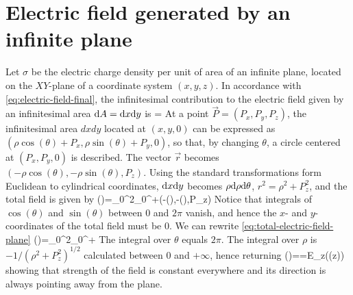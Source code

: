 \section{Electric field generated by an infinite plane}
Let $\sigma$ be the electric charge density per unit of area of an infinite plane, located on the $XY$-plane of a coordinate system $(x,y,z)$. In accordance with \ref{eq:electric-field-final}, the infinitesimal contribution to the electric field given by an infinitesimal area $\mathrm{d}A=\mathrm{d}x\mathrm{d}y$ is
\be
{}=
\ee
At a point $\vec{P}=(P_{x},P_{y},P_{z})$, the infinitesimal area $dxdy$ located at $(x,y,0)$ can be expressed as $(\rho\cos(\theta)+P_{x},\rho\sin(\theta)+P_{y},0)$, so that, by changing $\theta$, a circle centered at $(P_{x},P_{y},0)$ is described. The vector $\vec{r}$ becomes $(-\rho\cos(\theta),-\rho\sin(\theta),P_{z})$.
Using the standard transformations form Euclidean to cylindrical coordinates, $\mathrm{d}x\mathrm{d}y$ becomes $\rho\mathrm{d}\rho\mathrm{d}\theta$, $r^{2}=\rho^{2}+P_{z}^{2}$, and the total field is given by 
\be\label{eq:total-electric-field-plane}
()=\int_{0}^{2\pi}\total{\theta}\int_{0}^{+\infty}\total{\rho}(-\rho\cos(\theta),-\rho\sin(\theta),P_{z})
\ee
Notice that integrals of $\cos(\theta)$ and $\sin(\theta)$ between $0$ and $2\pi$ vanish, and hence the $x$- and $y$-coordinates of the total field must be $0$. We can rewrite \ref{eq:total-electric-field-plane}
\be\label{eq:total-electric-field-plane-simplified}
()=\int_{0}^{2\pi}\total{\theta}\int_{0}^{+\infty}\total{\rho}
\ee
The integral over $\theta$ equals $2\pi$. The integral over $\rho$ is $-1/(\rho^{2}+P_{z}^{2})^{1/2}$ calculated between $0$ and $+\infty$, hence returning
\be\label{eq:total-electric-field-plane-final}
()==E_{z}(\sign(z))
\ee
showing that strength of the field is constant everywhere and its direction is always pointing away from the plane.